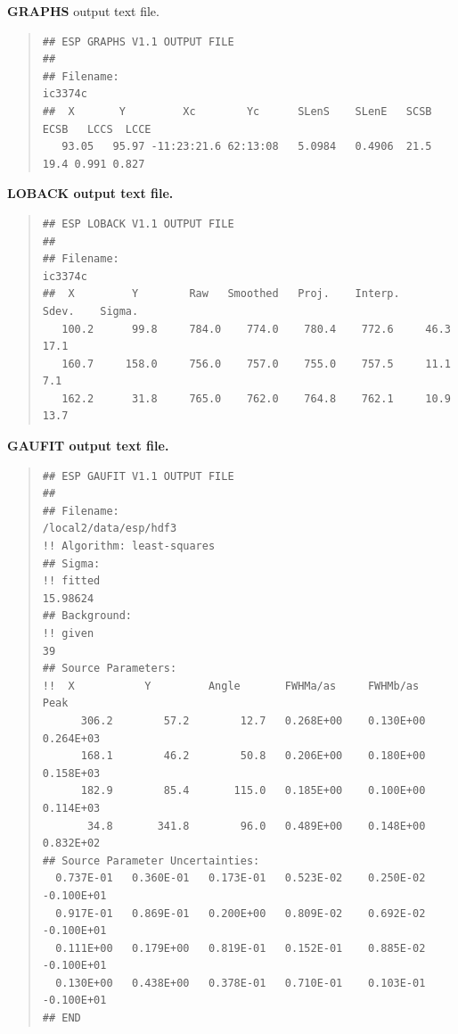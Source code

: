\documentclass[twoside,11pt]{article}
\newenvironment{myquote}{\begin{quote}\begin{small}}{\end{small}\end{quote}}
\begin{document}
\newpage
\textbf{GRAPHS} output text file.

\begin{myquote}
\begin{verbatim}
## ESP GRAPHS V1.1 OUTPUT FILE 
##
## Filename: 
ic3374c                                                   
##  X       Y         Xc        Yc      SLenS    SLenE   SCSB  ECSB   LCCS  LCCE
   93.05   95.97 -11:23:21.6 62:13:08   5.0984   0.4906  21.5  19.4 0.991 0.827
\end{verbatim}
\end{myquote}


\bf{LOBACK} output text file.

\begin{myquote}
\begin{verbatim}
## ESP LOBACK V1.1 OUTPUT FILE
##
## Filename: 
ic3374c                                                    
##  X         Y        Raw   Smoothed   Proj.    Interp.    Sdev.    Sigma.    
   100.2      99.8     784.0    774.0    780.4    772.6     46.3     17.1       
   160.7     158.0     756.0    757.0    755.0    757.5     11.1      7.1       
   162.2      31.8     765.0    762.0    764.8    762.1     10.9     13.7       
\end{verbatim}
\end{myquote}


\bf{GAUFIT} output text file.

\begin{myquote}
\begin{verbatim}
## ESP GAUFIT V1.1 OUTPUT FILE
##
## Filename: 
/local2/data/esp/hdf3                                                           
!! Algorithm: least-squares
## Sigma: 
!! fitted
15.98624
## Background: 
!! given
39
## Source Parameters:
!!  X           Y         Angle       FWHMa/as     FWHMb/as      Peak 
      306.2        57.2        12.7   0.268E+00    0.130E+00    0.264E+03
      168.1        46.2        50.8   0.206E+00    0.180E+00    0.158E+03
      182.9        85.4       115.0   0.185E+00    0.100E+00    0.114E+03
       34.8       341.8        96.0   0.489E+00    0.148E+00    0.832E+02
## Source Parameter Uncertainties:
  0.737E-01   0.360E-01   0.173E-01   0.523E-02    0.250E-02   -0.100E+01
  0.917E-01   0.869E-01   0.200E+00   0.809E-02    0.692E-02   -0.100E+01
  0.111E+00   0.179E+00   0.819E-01   0.152E-01    0.885E-02   -0.100E+01
  0.130E+00   0.438E+00   0.378E-01   0.710E-01    0.103E-01   -0.100E+01
## END                                     
\end{verbatim}
\end{myquote}
 
\end{document}
